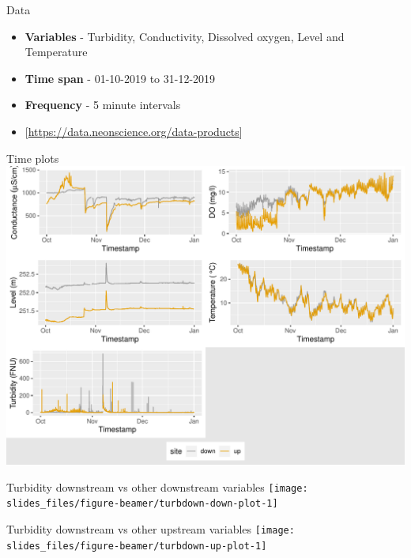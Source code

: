\documentclass[14pt,ignorenonframetext,compress]{beamer}
\begin{document}
\begin{frame}{Data}
\protect\hypertarget{data-1}{}
\begin{itemize}
\item
  \textbf{Variables} - Turbidity, Conductivity, Dissolved oxygen, Level
  and Temperature
\item
  \textbf{Time span} - 01-10-2019 to 31-12-2019
\item
  \textbf{Frequency} - 5 minute intervals
\item
  {[}\url{https://data.neonscience.org/data-products}{]}
\end{itemize}
\end{frame}

\begin{frame}{Time plots}
\protect\hypertarget{time-plots}{}
\includegraphics[width=1\linewidth]{slides_files/figure-beamer/tsplots-1}
\end{frame}

\begin{frame}
\begin{block}{Turbidity downstream vs other downstream variables}
\protect\hypertarget{turbidity-downstream-vs-other-downstream-variables}{}
\texttt{[image: slides\_files/figure-beamer/turbdown-down-plot-1]}
\end{block}
\end{frame}

\begin{frame}
\begin{block}{Turbidity downstream vs other upstream variables}
\protect\hypertarget{turbidity-downstream-vs-other-upstream-variables}{}
\texttt{[image: slides\_files/figure-beamer/turbdown-up-plot-1]}
\end{block}
\end{frame}
\end{document}
